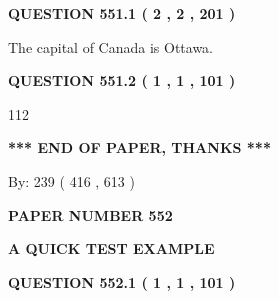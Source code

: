 \documentclass[12pt]{article}
\begin{document}
{\textbf{\Large{QUESTION
551.1 
 ( 2 , 2 , 201 )
}}}
  
  
 
 
\noindent{}
 
 
The capital of Canada is Ottawa.
 
 
 
 
  
\vspace{0.2in}
  
{\textbf{\Large{QUESTION
551.2 
 ( 1 , 1 , 101 )
}}}
  
  
 
 
\noindent{}

112
 
 
   
   
 \vspace{0.2in}
 
   
   
   
   
\vspace{1.0in} 
{\textbf{\large{ *** END OF PAPER, THANKS *** }}} 
   
   
\hspace{1.0in} By: 
 239 ( 416 ,  613 )
   
   
   
   
\newpage 
\setcounter{page}{ 
   552001 } 
   
   
   
   
 {\textbf{ \Large{ PAPER NUMBER  552  }}}
   
   
\vspace{0.2in}
   
   
   
   
   
   
 \vspace{0.2in}
{\LARGE {\textbf{ A QUICK TEST EXAMPLE}}}
   
   
  
\vspace{0.2in}
  
{\textbf{\Large{QUESTION
552.1 
 ( 1 , 1 , 101 )
}}}
  
  
 
 
\noindent{}
\end{document}
